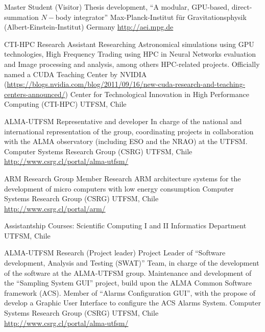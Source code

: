 \documentclass[12pt,a4paper]{moderncv}
\newcommand{\gray}{\textcolor{gray}}
\newcommand{\myurl}[1]{\gray{\url{#1}}}
\newcommand{\aei}{Max-Planck-Institut für Gravitationsphysik (Albert-Einstein-Institut)}
\begin{document}
\newpage
{}
        {Master Student (Visitor)}
        {Thesis development, %
        ``A modular, GPU-based, direct-summation $N-$body integrator'' }
        {\aei}
        {Germany}
        {\myurl{http://aei.mpg.de}}

        {CTI-HPC Research Assistant}
        {Researching %
         Astronomical simulations using GPU technologies, %
         High Frequency Trading using HPC in Neural Networks evaluation %
         and Image processing and analysis, among others HPC-related projects.
         Officially named a CUDA Teaching Center by NVIDIA
         (\myurl{https://blogs.nvidia.com/blog/2011/09/16/new-cuda-research-and-teaching-centers-announced/})
         }
        {Center for Technological Innovation in High Performance Computing (CTI-HPC)}
        {UTFSM, Chile}
        {}

        {ALMA-UTFSM Representative and developer}
        {In charge of the national and international representation of the group,
         coordinating projects in collaboration with the ALMA observatory
         (including ESO and the NRAO) at the UTFSM.}
        {Computer Systems Research Group (CSRG)}
        {UTFSM, Chile}
        {\myurl{http://www.csrg.cl/portal/alma-utfsm/}}

        {ARM Research Group Member}
        {Research ARM architecture systems for the development of micro computers
         with low energy consumption}
        {Computer Systems Research Group (CSRG)}
        {UTFSM, Chile}
        {\myurl{http://www.csrg.cl/portal/arm/}}

        {Assistantship}
        {Courses: Scientific Computing I and II}
        {Informatics Department}
        {UTFSM, Chile}
        {}

        {ALMA-UTFSM Research (Project leader)}
        {Project Leader of ``Software development, Analysis and Testing (SWAT)''
         Team, in charge of the development of the software at the ALMA-UTFSM group.
         Maintenance and development of the ``Sampling System GUI'' project,
         build upon the ALMA Common Software framework (ACS).
         Member of ``Alarms Configuration GUI'', with the propose of develop a
         Graphic User Interface to configure the ACS Alarms System.}
        {Computer Systems Research Group (CSRG)}
        {UTFSM, Chile}
        {\myurl{http://www.csrg.cl/portal/alma-utfsm/}}
\end{document}
